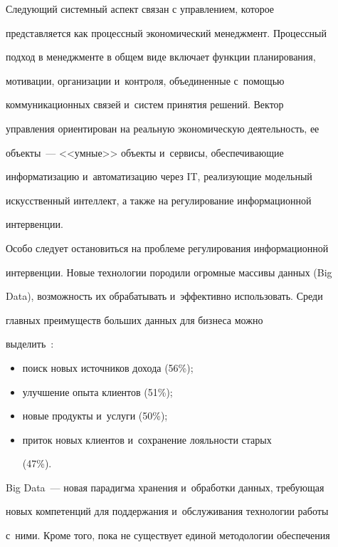   Следующий системный аспект связан с управлением, которое 

представляется как процессный экономический менеджмент. Процессный 

подход в менеджменте в общем виде включает функции планирования, 

мотивации, организации и~контроля, объединенные с~по\-мощью 

коммуникационных связей и~систем принятия решений. Вектор  

управ\-ле\-ния ориентирован на реальную экономическую деятельность, ее 

объекты~--- <<умные>> объекты и~сервисы, обеспечивающие 

информатизацию и~автоматизацию через IT, реализующие модельный 

искусственный интеллект, а также на регулирование информационной 

интервенции. 

  

  Особо следует остановиться на проблеме регулирования информационной 

интервенции. Новые технологии породили огромные массивы данных (Big 

Data), возможность их обрабатывать и~эффективно использовать. Среди 

главных преимуществ больших данных для бизнеса можно  

выделить~\cite{6-zk}: 

  \begin{itemize}

\item поиск новых источников дохода (56\%);

\item улучшение опыта клиентов (51\%);

\item новые продукты и~услуги (50\%);

\item приток новых клиентов и~сохранение лояльности старых 

(47\%).

\end{itemize}



  Big Data~--- новая парадигма хранения и~обработки данных, требующая 

новых компетенций для поддержания и~обслуживания технологии работы 

с~ними. Кроме того, пока не существует единой методологии обеспечения 

